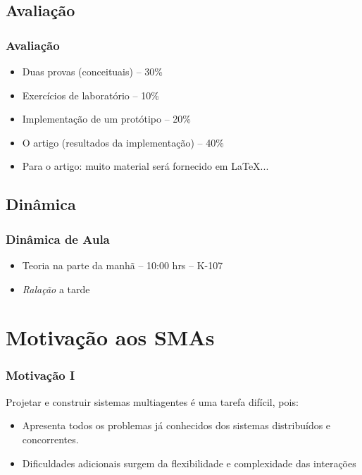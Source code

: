 \documentclass[10pt]{beamer}
\begin{document}
\subsection{Avaliação}
\begin{frame}

    \frametitle{Avaliação}

    \begin{itemize}
      \item Duas provas (conceituais) -- 30\%
      \item Exercícios de laboratório  -- 10\%
      \item Implementação de um protótipo  -- 20\%
      \item O artigo (resultados da implementação)  -- 40\%
      \item Para o artigo: muito material será fornecido em \LaTeX ...
       
      
    \end{itemize}
\end{frame}



\subsection{Dinâmica}
\begin{frame}

    \frametitle{Dinâmica de Aula}

    \begin{itemize}
      \item Teoria na parte da manhã -- 10:00 hrs -- K-107
      \item \textit{Ralação} a tarde
      
    \end{itemize}
\end{frame}







\section{Motivação aos SMAs}
\begin{frame}

    \frametitle{Motivação I}
    Projetar e construir sistemas multiagentes é uma tarefa difícil, pois:
    \begin{itemize}
    \pause
      \item Apresenta todos os problemas já conhecidos 
dos sistemas distribuídos e concorrentes.
\pause
      \item Dificuldades adicionais surgem da flexibilidade 
e complexidade das interações
    
    \end{itemize}
\end{frame}
\end{document}
